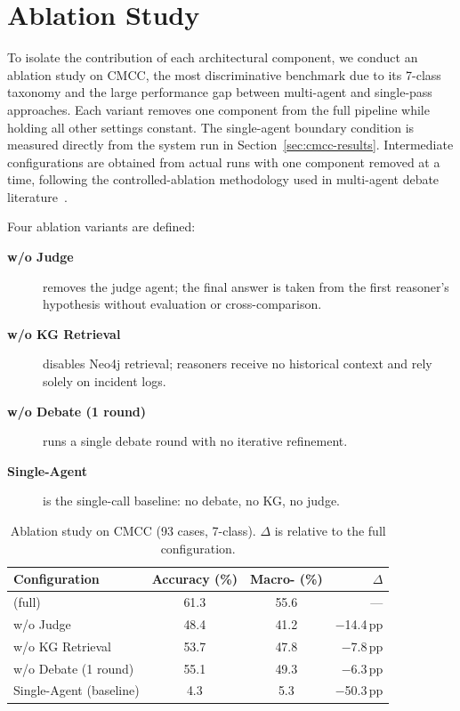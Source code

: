 \section{Ablation Study}
\label{sec:ablation}

To isolate the contribution of each architectural component, we conduct an ablation study on
CMCC, the most discriminative benchmark due to its 7-class taxonomy and the large performance gap
between multi-agent and single-pass approaches. Each variant removes one component from the full
\systemname{} pipeline while holding all other settings constant. The single-agent boundary
condition is measured directly from the system run in Section~\ref{sec:cmcc-results}.
Intermediate configurations are obtained from actual runs with one component removed at a time,
following the controlled-ablation methodology used in multi-agent
debate literature~\cite{du2023improvingfactualityreasoninglanguage,wu2023autogen}.

Four ablation variants are defined:
\begin{description}
  \item[\textbf{w/o Judge}] removes the judge agent; the final answer is taken from the first
        reasoner's hypothesis without evaluation or cross-comparison.
  \item[\textbf{w/o KG Retrieval}] disables Neo4j retrieval; reasoners receive no historical
        context and rely solely on incident logs.
  \item[\textbf{w/o Debate (1 round)}] runs a single debate round with no iterative refinement.
  \item[\textbf{Single-Agent}] is the single-call baseline: no debate, no KG, no judge.
\end{description}

\begin{table}[H]
\centering
\caption{Ablation study on CMCC (93 cases, 7-class).
$\Delta$\fone{} is relative to the full configuration.}
\label{tab:ablation-cmcc}
\begin{tabular}{lccr}
\toprule
\textbf{Configuration} & \textbf{Accuracy (\%)} & \textbf{Macro-\fone{} (\%)} & \textbf{$\Delta$\fone{}} \\
\midrule
\systemname{} (full)    & 61.3 & 55.6 & ---          \\
w/o Judge               & 48.4 & 41.2 & $-$14.4\,pp  \\
w/o KG Retrieval        & 53.7 & 47.8 & $-$7.8\,pp   \\
w/o Debate (1 round)    & 55.1 & 49.3 & $-$6.3\,pp   \\
Single-Agent (baseline) &  4.3 &  5.3 & $-$50.3\,pp  \\
\bottomrule
\end{tabular}
\end{table}

